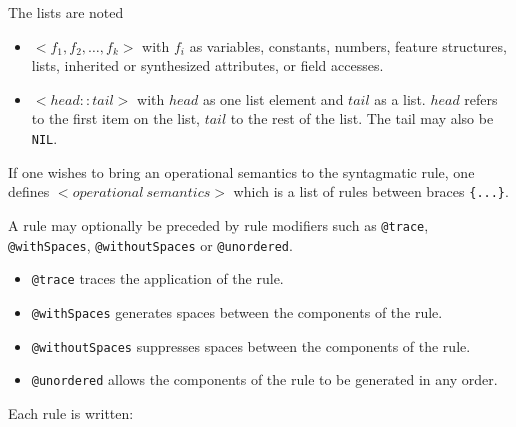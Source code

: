 \documentclass[11pt]{article}
\begin{document}
The lists are noted
\begin{itemize}
	\item $<f_1, f_2, \dots, f_k>$ with $f_i$ as variables, constants,
	      numbers, feature structures, lists, inherited or synthesized
	      attributes, or field accesses.
	\item $<head::tail>$ with $head$ as one list element and $tail$ as a list.
	      $head$ refers to the first item on the list, $tail$ to the rest of
	      the list.  The tail may also be \verb#NIL#.
\end{itemize}

If one wishes to bring an operational semantics to the syntagmatic
rule, one defines $<operational~semantics>$ which is a list of rules
between braces \verb#{...}#.

A rule may optionally be preceded by rule modifiers such as
\verb#@trace#, \verb#@withSpaces#, \verb#@withoutSpaces# or
\verb#@unordered#.

\begin{itemize}
	\item \verb#@trace# traces the application of the rule.
	\item \verb#@withSpaces# generates spaces between the components of the rule.
	\item \verb#@withoutSpaces# suppresses spaces between the components of the rule.
	\item \verb#@unordered# allows the components of the rule to be generated in any order.
\end{itemize}

Each rule is written:
\end{document}
